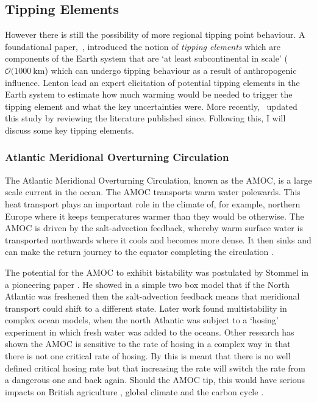 \subsection{Tipping Elements}

However there is still the possibility of more regional tipping point behaviour. A foundational paper,~\cite{Lenton2008}, introduced the notion of \emph{tipping elements} which
are components of the Earth system that are `at least subcontinental in scale' ($\mathcal{O}(\SI{1000}{\kilo\meter}$) which can undergo tipping behaviour as a result of
anthropogenic influence. Lenton lead an expert elicitation of potential tipping elements in the Earth system to estimate how much warming would be needed to trigger the tipping element
and what the key uncertainties were. More recently,~\cite{ArmstrongMcKay2022} updated this study by reviewing the literature published since.  Following this, I will discuss some key tipping elements.

\subsubsection{Atlantic Meridional Overturning Circulation}
The Atlantic Meridional Overturning Circulation, known as the AMOC, is a large scale current in the ocean. The AMOC transports warm water polewards. This heat transport plays an
important role in the climate of, for example, northern Europe where it keeps temperatures warmer than they would be otherwise. The AMOC is driven by the salt-advection feedback, whereby
warm surface water is transported northwards where it cools and becomes more dense.  It then sinks and can make the return journey to the equator completing the circulation  \parencite{Vallis}.

The potential for the AMOC to exhibit bistability was postulated by Stommel in a pioneering paper \parencite{STOMMEL1961}. He showed in a simple two box model that if the North Atlantic was
freshened then the salt-advection feedback means that meridional transport could shift to a different state. Later work \parencite{Rahmstorf1995,Hawkins2011} found multistability in
complex ocean models, when the north Atlantic was subject to a `hosing' experiment in which fresh water was added to the oceans. Other research has shown the AMOC is sensitive to the
rate of hosing \parencite{Alkhayuon2019} in a complex way \parencite{Lohmann2021} in that there is not one critical rate of hosing. By this is meant that there is no well defined critical
hosing rate but that increasing the rate will switch the rate from a dangerous one and back again. Should the AMOC tip, this would have serious impacts on British agriculture
\parencite{Ritchie2020a}, global climate \parencite{Jackson2015} and the carbon cycle \parencite{Bozbiyik2011}.



